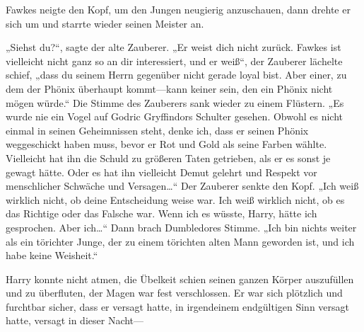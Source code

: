 Fawkes neigte den Kopf, um den Jungen neugierig anzuschauen, dann drehte er sich um und starrte wieder seinen Meister an.

„Siehst du?“, sagte der alte Zauberer. „Er weist dich nicht zurück. Fawkes ist vielleicht nicht ganz so an dir interessiert, und er weiß“, der Zauberer lächelte schief, „dass du seinem Herrn gegenüber nicht gerade loyal bist. Aber einer, zu dem der Phönix überhaupt kommt—kann keiner sein, den ein Phönix nicht mögen würde.“
Die Stimme des Zauberers sank wieder zu einem Flüstern.
„Es wurde nie ein Vogel auf Godric Gryffindors Schulter gesehen. Obwohl es nicht einmal in seinen Geheimnissen steht, denke ich, dass er seinen Phönix weggeschickt haben muss, bevor er Rot und Gold als seine Farben wählte. Vielleicht hat ihn die Schuld zu größeren Taten getrieben, als er es sonst je gewagt hätte. Oder es hat ihn vielleicht Demut gelehrt und Respekt vor menschlicher Schwäche und Versagen…“ Der Zauberer senkte den Kopf.
„Ich weiß wirklich nicht, ob deine Entscheidung weise war. Ich weiß wirklich nicht, ob es das Richtige oder das Falsche war. Wenn ich es wüsste, Harry, hätte ich gesprochen. Aber ich…“ Dann brach Dumbledores Stimme. „Ich bin nichts weiter als ein törichter Junge, der zu einem törichten alten Mann geworden ist, und ich habe keine Weisheit.“

Harry konnte nicht atmen, die Übelkeit schien seinen ganzen Körper auszufüllen und zu überfluten, der Magen war fest verschlossen. Er war sich plötzlich und furchtbar sicher, dass er versagt hatte, in irgendeinem endgültigen Sinn versagt hatte, versagt in dieser Nacht—

